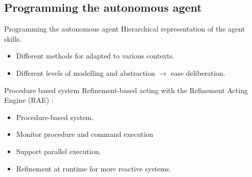 \subsection{Programming the autonomous agent}

\begin{frame}{Programming the autonomous agent}
    Hierarchical representation of the agent skills.
    \begin{itemize}
        \item Different methods for adapted to various contexts.
        \item Different levels of modelling and abstraction $\rightarrow$ ease deliberation.
    \end{itemize}
   
\end{frame}

\begin{frame}{Procedure based system}
    Refinement-based acting with the Refinement Acting Engine (RAE) \cite{ghallabAutomatedPlanningActing2016}:
    \begin{itemize}
        \item Procedure-based system.
        \item Monitor procedure and command execution
        \item Support parallel execution.
        \item Refinement at runtime for more reactive systems.
    \end{itemize}
\end{frame}


